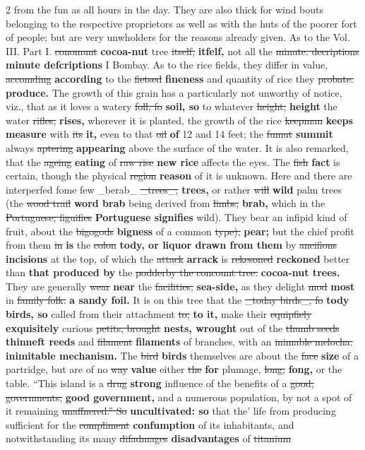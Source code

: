 \documentclass[10pt]{article}
\begin{document}
\begin{multicols}{2}
from the fun as all hours in the day. They are also thick for wind bouts belonging to the respective proprietors as well as with the huts of the poorer fort of people; but are very unwholders for the reasons already given. As to the Vol. III. Part I. \sout{conomunt} \textbf{cocoa-nut} tree \sout{itself,} \textbf{itfelf,} not all the \sout{minute. decriptions} \textbf{minute defcriptions} I Bombay. As to the rice fields, they differ in value, \sout{accomding} \textbf{according} to the \sout{fietsed} \textbf{fineness} and quantity of rice they \sout{probate.} \textbf{produce.} The growth of this grain has a particularly not unworthy of notice, viz., that as it loves a watery \sout{foll, fo} \textbf{soil, so} to whatever \sout{height,} \textbf{height} the water \sout{rifles,} \textbf{rises,} wherever it is planted, the growth of the rice \sout{keepman} \textbf{keeps measure} with \sout{its} \textbf{it,} even to that \sout{oil} \textbf{of} 12 and 14 feet; the \sout{fumut} \textbf{summit} always \sout{aptering} \textbf{appearing} above the surface of the water. It is also remarked, that the \sout{ageing} \textbf{eating} of \sout{raw rise} \textbf{new rice} affects the eyes. The \sout{fish} \textbf{fact} is certain, though the physical \sout{region} \textbf{reason} of it is unknown. Here and there are interperfed fome few \_berab\_ \sout{\_trees\_,} \textbf{trees,} or rather \sout{will} \textbf{wild} palm trees (the \sout{wood trail} \textbf{word brab} being derived from \sout{limbs,} \textbf{brab,} which in the \sout{Portuguese, figuifies} \textbf{Portuguese signifies} wild). They bear an infipid kind of fruit, about the \sout{bigogods} \textbf{bigness} of a common \sout{type),} \textbf{pear;} but the chief profit from them \sout{in} \textbf{is} the \sout{colon} \textbf{tody, or liquor drawn from them} by \sout{ancifions} \textbf{incisions} at the top, of which the \sout{attack} \textbf{arrack} is \sout{rekesoned} \textbf{reckoned} better than \textbf{that produced by} the \sout{podderby the concount tree.} \textbf{cocoa-nut trees.} They are generally \sout{wear} \textbf{near} the \sout{facilities,} \textbf{sea-side,} as they delight \sout{mod} \textbf{most} in \sout{family folk.} \textbf{a sandy foil.} It is on this tree that the \sout{\_today birds\_, fo} \textbf{tody birds, so} called from their attachment \sout{to,} \textbf{to it,} make their \sout{equipfiely} \textbf{exquisitely} curious \sout{petits, brought} \textbf{nests, wrought} out of the \sout{thumb seeds} \textbf{thinneft reeds} and \sout{filament} \textbf{filaments} of branches, with an \sout{inimable melocha.} \textbf{inimitable mechanism.} The \sout{bird} \textbf{birds} themselves are about the \sout{face} \textbf{size} of a partridge, but are of no \sout{way} \textbf{value} either \sout{the} \textbf{for} plumage, \sout{long,} \textbf{fong,} or the table. “This island is a \sout{drug} \textbf{strong} influence of the benefits of a \sout{good, governments,} \textbf{good government,} and a numerous population, by not a spot of it remaining \sout{unaffnered.” So} \textbf{uncultivated: so} that the’ life from producing sufficient for the \sout{compliment} \textbf{confumption} of its inhabitants, and notwithstanding its many \sout{difadmages} \textbf{disadvantages} of \sout{titanium} 
\end{multicols}
\end{document}
